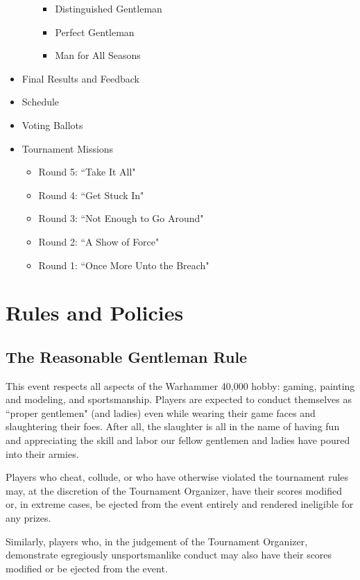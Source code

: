 \documentclass[10pt,titlepage]{article}
\begin{document}
\begin{itemize}
\begin{itemize}
\begin{itemize}
    \item Distinguished Gentleman
    \item Perfect Gentleman
    \item Man for All Seasons
    \end{itemize}
  \end{itemize}
\item Final Results and Feedback
\item Schedule
\item Voting Ballots
\item Tournament Missions
  \begin{itemize}
  \item Round 5: ``Take It All"
  \item Round 4: ``Get Stuck In"
  \item Round 3: ``Not Enough to Go Around"
  \item Round 2: ``A Show of Force"
  \item Round 1: ``Once More Unto the Breach"
  \end{itemize}
\end{itemize}

\newpage

\section*{Rules and Policies}

\subsection*{The Reasonable Gentleman Rule}

This event respects all aspects of the Warhammer 40,000 hobby: gaming, painting and modeling, and sportsmanship. Players are expected to conduct themselves as ``proper gentlemen" (and ladies) even while wearing their game faces and slaughtering their foes. After all, the slaughter is all in the name of having fun and appreciating the skill and labor our fellow gentlemen and ladies have poured into their armies.

Players who cheat, collude, or who have otherwise violated the tournament rules may, at the discretion of the Tournament Organizer, have their scores modified or, in extreme cases, be ejected from the event entirely and rendered ineligible for any prizes.

Similarly, players who, in the judgement of the Tournament Organizer, demonstrate egregiously unsportsmanlike conduct may also have their scores modified or be ejected from the event.
\end{document}
